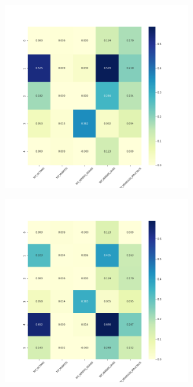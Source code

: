 \begin{figure}[H]
\begin{subfigure}{.5\textwidth}
\end{subfigure}
\begin{subfigure}{.5\textwidth}
  \centering
  \includegraphics[width=0.9\textwidth]{imagenes/case1/kmeans/heatmaps/hm_kmeans_case1_entrada_k5.png}
\end{subfigure}
\begin{subfigure}{.5\textwidth}
  \centering
  \includegraphics[width=0.9\textwidth]{imagenes/case1/kmeans/heatmaps/hm_kmeans_case1_entrada_k6.png}

\end{subfigure}
\end{figure}
